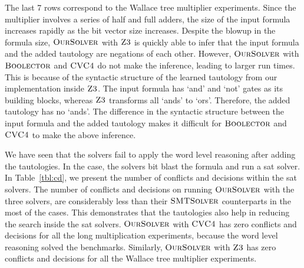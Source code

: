 The last 7 rows correspond to the Wallace tree multiplier experiments.
%
Since the multiplier involves a series of half and full adders, the
size of the input formula increases rapidly as the bit vector size
increases.
%
Despite the blowup in the formula size, $\textsc{OurSolver}$ with $\textsc{Z3}$ is
quickly able to infer that the input formula and the added tautology
are negations of each other.
%
However, $\textsc{OurSolver}$ with $\textsc{Boolector}$ and $\textsc{CVC4}$ do not make the
inference, leading to larger run times.
%
This is because of the syntactic structure of the learned tautology
from our implementation inside $\textsc{Z3}$.
%
The input formula has `and' and `not' gates as its building blocks,
whereas $\textsc{Z3}$ transforms all `ands' to `ors'.
%
Therefore, the added tautology has no `ands'.
%
The difference in the syntactic structure between the input formula
and the added tautology makes it difficult for $\textsc{Boolector}$ and
$\textsc{CVC4}$ to make the above inference.
%

We have seen that the solvers fail to apply the word level reasoning
after adding the tautologies.
%
In the case, the solvers bit blast the formula and run a sat solver.
%
In Table~\ref{tbl:cd}, we present the number of conflicts and decisions within
the sat solvers.
%
The number of conflicts and decisions on running $\textsc{OurSolver}$ with the
three solvers, are considerably less than their $\textsc{SMTSolver}$
counterparts in the most of the cases.
%
This demonstrates that the tautologies also help in reducing the
search inside the sat solvers. 
%
$\textsc{OurSolver}$ with $\textsc{CVC4}$ has zero conflicts and
decisions for all the long multiplication experiments, because the 
word level reasoning solved the benchmarks.
%
Similarly, $\textsc{OurSolver}$ with $\textsc{Z3}$ has zero conflicts and decisions for all the
Wallace tree multiplier experiments.


%








